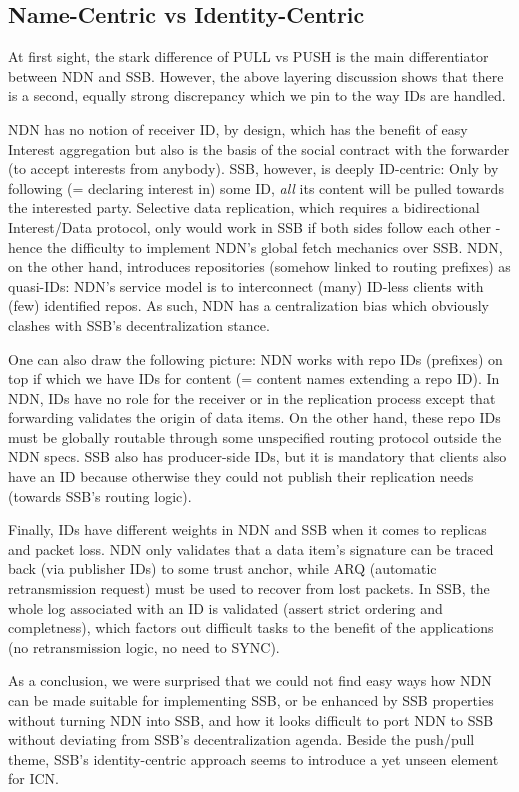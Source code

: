 \documentclass[9pt,sigconf,rewiew]{acmart}
\begin{document}
\subsection{Name-Centric vs Identity-Centric}

At first sight, the stark difference of PULL vs PUSH is the main
differentiator between NDN and SSB. However, the above layering
discussion shows that there is a second, equally strong discrepancy
which we pin to the way IDs are handled.

NDN has no notion of receiver ID, by design, which has the benefit of
easy Interest aggregation but also is the basis of the social contract
with the forwarder (to accept interests from anybody). SSB, however,
is deeply ID-centric: Only by following (= declaring interest in) some
ID, {\em all} its content will be pulled towards the interested
party. Selective data replication, which requires a bidirectional
Interest/Data protocol, only would work in SSB if both sides follow
each other - hence the difficulty to implement NDN's global fetch
mechanics over SSB. NDN, on the other hand, introduces repositories
(somehow linked to routing prefixes) as quasi-IDs: NDN's service model
is to interconnect (many) ID-less clients with (few) identified repos.
As such, NDN has a centralization bias which obviously clashes with
SSB's decentralization stance.

One can also draw the following picture: NDN works with repo IDs
(prefixes) on top if which we have IDs for content (= content names
extending a repo ID). In NDN, IDs have no role for the receiver or in
the replication process except that forwarding validates the origin of
data items. On the other hand, these repo IDs must be globally routable
through some unspecified routing protocol outside the NDN specs. SSB
also has producer-side IDs, but it is mandatory that clients also have
an ID because otherwise they could not publish their replication needs
(towards SSB's routing logic).

Finally, IDs have different weights in NDN and SSB when it comes to
replicas and packet loss. NDN only validates that a data item's
signature can be traced back (via publisher IDs) to some trust anchor,
while ARQ (automatic retransmission request) must be used to recover
from lost packets. In SSB, the whole log associated with an ID is
validated (assert strict ordering and completness), which factors out
difficult tasks to the benefit of the applications (no retransmission
logic, no need to SYNC).

As a conclusion, we were surprised that we could not find easy ways
how NDN can be made suitable for implementing SSB, or be enhanced by
SSB properties without turning NDN into SSB, and how it looks
difficult to port NDN to SSB without deviating from SSB's
decentralization agenda. Beside the push/pull theme, SSB's
identity-centric approach seems to introduce a yet unseen element for
ICN.
\end{document}
